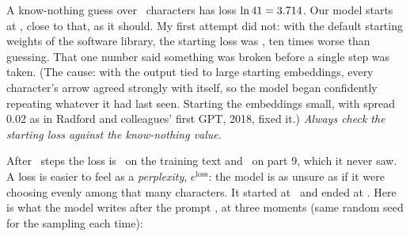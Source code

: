 \Sanity A know-nothing guess over \nEightRunV\ characters has loss $\ln 41 = 3.714$. Our
model starts at \nEightRunLossStart, close to that, as it should. My first attempt did not: with the default
starting weights of the software library, the starting loss was \nEightRunBadInit, ten times worse than
guessing. That one number said something was broken before a single step was taken. (The cause: with the
output tied to large starting embeddings, every character's arrow agreed strongly with itself, so the model
began confidently repeating whatever it had last seen. Starting the embeddings small, with spread 0.02 as in
Radford and colleagues' first GPT, 2018, fixed it.) \emph{Always check the starting loss against the
know-nothing value.}

\par\medskip\noindent\begin{minipage}{\linewidth}\centering
{}
\end{minipage}\par\medskip

After \nEightRunSteps\ steps the loss is \nEightRunLossEnd\ on the training text and \nEightRunValEnd\ on
part 9, which it never saw. A loss is easier to feel as a \emph{perplexity}, $e^{\text{loss}}$: the model
is as unsure as if it were choosing evenly among that many characters. It started at
\nEightRunPplStart\ and ended at \nEightRunPplEnd. Here is what the model writes after the prompt
, at three moments (same random seed for the sampling each time):


